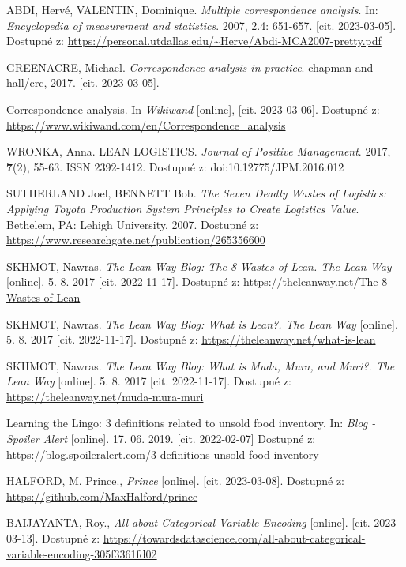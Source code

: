 \begin{thebibliography}{1}
ABDI, Hervé, VALENTIN, Dominique. \textit{Multiple correspondence analysis}. In: \textit{Encyclopedia of measurement and statistics}. 2007, 2.4: 651-657. [cit. 2023-03-05]. Dostupné z: \url{https://personal.utdallas.edu/\~Herve/Abdi-MCA2007-pretty.pdf}

GREENACRE, Michael. \textit{Correspondence analysis in practice}. chapman and hall/crc, 2017. [cit. 2023-03-05]. 

Correspondence analysis. In \textit{Wikiwand} [online], [cit. 2023-03-06]. Dostupné z: \url{https://www.wikiwand.com/en/Correspondence\_analysis}

WRONKA, Anna. LEAN LOGISTICS. \textit{Journal of Positive Management}. 2017, \textbf{7}(2), 55-63. ISSN 2392-1412. Dostupné z: doi:10.12775/JPM.2016.012

SUTHERLAND Joel, BENNETT Bob. \textit{The Seven Deadly Wastes of Logistics: Applying Toyota Production System Principles to Create Logistics Value}. Bethelem, PA: Lehigh University, 2007. Dostupné z: \url{https://www.researchgate.net/publication/265356600}

SKHMOT, Nawras. \textit{The Lean Way Blog: The 8 Wastes of Lean. The Lean Way} [online]. 5. 8. 2017 [cit. 2022-11-17]. Dostupné z: \url{https://theleanway.net/The-8-Wastes-of-Lean}

SKHMOT, Nawras. \textit{The Lean Way Blog: What is Lean?. The Lean Way} [online]. 5. 8. 2017 [cit. 2022-11-17]. Dostupné z: \url{https://theleanway.net/what-is-lean}

SKHMOT, Nawras. \textit{The Lean Way Blog: What is Muda, Mura, and Muri?. The Lean Way} [online]. 5. 8. 2017 [cit. 2022-11-17]. Dostupné z:
 \url{https://theleanway.net/muda-mura-muri}

Learning the Lingo: 3 definitions related to unsold food inventory. In: \textit{Blog - Spoiler Alert} [online]. 17. 06. 2019. [cit. 2022-02-07] Dostupné z: \url{https://blog.spoileralert.com/3-definitions-unsold-food-inventory}

HALFORD, M. Prince., \textit{Prince} [online]. [cit. 2023-03-08]. Dostupné z: \url{https://github.com/MaxHalford/prince}

BAIJAYANTA, Roy., \textit{All about Categorical Variable Encoding } [online]. [cit. 2023-03-13]. Dostupné z: \url{https://towardsdatascience.com/all-about-categorical-variable-encoding-305f3361fd02}


\end{thebibliography}
